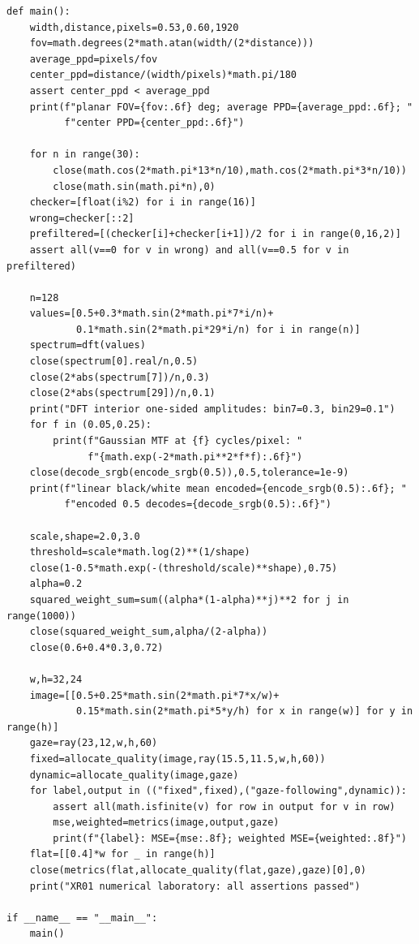 \begin{verbatim}
def main():
    width,distance,pixels=0.53,0.60,1920
    fov=math.degrees(2*math.atan(width/(2*distance)))
    average_ppd=pixels/fov
    center_ppd=distance/(width/pixels)*math.pi/180
    assert center_ppd < average_ppd
    print(f"planar FOV={fov:.6f} deg; average PPD={average_ppd:.6f}; "
          f"center PPD={center_ppd:.6f}")

    for n in range(30):
        close(math.cos(2*math.pi*13*n/10),math.cos(2*math.pi*3*n/10))
        close(math.sin(math.pi*n),0)
    checker=[float(i%2) for i in range(16)]
    wrong=checker[::2]
    prefiltered=[(checker[i]+checker[i+1])/2 for i in range(0,16,2)]
    assert all(v==0 for v in wrong) and all(v==0.5 for v in prefiltered)

    n=128
    values=[0.5+0.3*math.sin(2*math.pi*7*i/n)+
            0.1*math.sin(2*math.pi*29*i/n) for i in range(n)]
    spectrum=dft(values)
    close(spectrum[0].real/n,0.5)
    close(2*abs(spectrum[7])/n,0.3)
    close(2*abs(spectrum[29])/n,0.1)
    print("DFT interior one-sided amplitudes: bin7=0.3, bin29=0.1")
    for f in (0.05,0.25):
        print(f"Gaussian MTF at {f} cycles/pixel: "
              f"{math.exp(-2*math.pi**2*f*f):.6f}")
    close(decode_srgb(encode_srgb(0.5)),0.5,tolerance=1e-9)
    print(f"linear black/white mean encoded={encode_srgb(0.5):.6f}; "
          f"encoded 0.5 decodes={decode_srgb(0.5):.6f}")

    scale,shape=2.0,3.0
    threshold=scale*math.log(2)**(1/shape)
    close(1-0.5*math.exp(-(threshold/scale)**shape),0.75)
    alpha=0.2
    squared_weight_sum=sum((alpha*(1-alpha)**j)**2 for j in range(1000))
    close(squared_weight_sum,alpha/(2-alpha))
    close(0.6+0.4*0.3,0.72)

    w,h=32,24
    image=[[0.5+0.25*math.sin(2*math.pi*7*x/w)+
            0.15*math.sin(2*math.pi*5*y/h) for x in range(w)] for y in range(h)]
    gaze=ray(23,12,w,h,60)
    fixed=allocate_quality(image,ray(15.5,11.5,w,h,60))
    dynamic=allocate_quality(image,gaze)
    for label,output in (("fixed",fixed),("gaze-following",dynamic)):
        assert all(math.isfinite(v) for row in output for v in row)
        mse,weighted=metrics(image,output,gaze)
        print(f"{label}: MSE={mse:.8f}; weighted MSE={weighted:.8f}")
    flat=[[0.4]*w for _ in range(h)]
    close(metrics(flat,allocate_quality(flat,gaze),gaze)[0],0)
    print("XR01 numerical laboratory: all assertions passed")

if __name__ == "__main__":
    main()
\end{verbatim}


